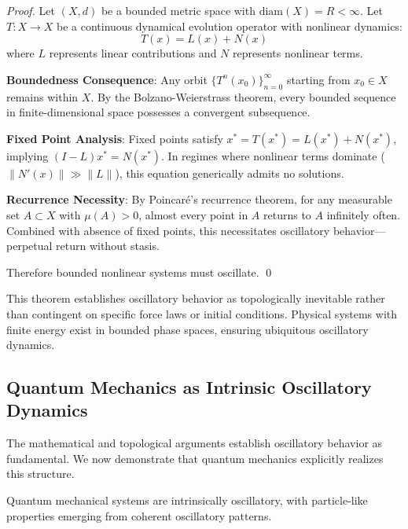 \begin{proof}
Let $(X, d)$ be a bounded metric space with $\text{diam}(X) = R < \infty$. Let $T: X \to X$ be a continuous dynamical evolution operator with nonlinear dynamics:
$$T(x) = L(x) + N(x)$$
where $L$ represents linear contributions and $N$ represents nonlinear terms.

\textbf{Boundedness Consequence}: Any orbit $\{T^n(x_0)\}_{n=0}^{\infty}$ starting from $x_0 \in X$ remains within $X$. By the Bolzano-Weierstrass theorem, every bounded sequence in finite-dimensional space possesses a convergent subsequence.

\textbf{Fixed Point Analysis}: Fixed points satisfy $x^* = T(x^*) = L(x^*) + N(x^*)$, implying $(I - L)x^* = N(x^*)$. In regimes where nonlinear terms dominate ($\|N'(x)\| \gg \|L\|$), this equation generically admits no solutions.

\textbf{Recurrence Necessity}: By Poincaré's recurrence theorem, for any measurable set $A \subset X$ with $\mu(A) > 0$, almost every point in $A$ returns to $A$ infinitely often. Combined with absence of fixed points, this necessitates oscillatory behavior—perpetual return without stasis.

Therefore bounded nonlinear systems must oscillate. \qed
\end{proof}

\begin{remark}
This theorem establishes oscillatory behavior as topologically inevitable rather than contingent on specific force laws or initial conditions. Physical systems with finite energy exist in bounded phase spaces, ensuring ubiquitous oscillatory dynamics.
\end{remark}

\subsection{Quantum Mechanics as Intrinsic Oscillatory Dynamics}

The mathematical and topological arguments establish oscillatory behavior as fundamental. We now demonstrate that quantum mechanics explicitly realizes this structure.

\begin{theorem}
\label{thm:quantum_oscillatory}
Quantum mechanical systems are intrinsically oscillatory, with particle-like properties emerging from coherent oscillatory patterns.
\end{theorem}

